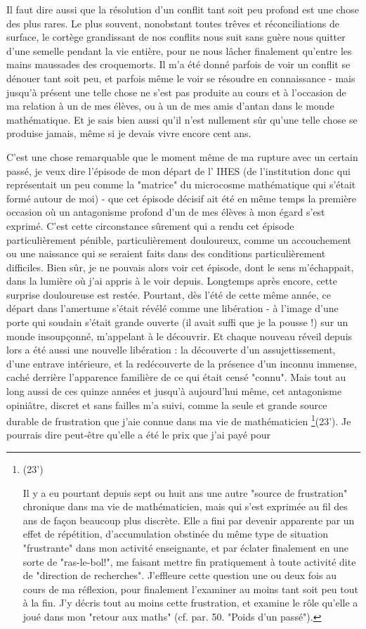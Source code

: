 Il faut dire aussi que la résolution d'un conflit tant soit peu profond est une chose des plus rares. Le plus souvent, nonobstant toutes trêves et réconciliations de surface, le cortège grandissant de nos conflits nous suit sans guère nous quitter d'une semelle pendant la vie entière, pour ne nous lâcher finalement qu'entre les mains maussades des croquemorts. Il m'a été donné parfois de voir un conflit se dénouer tant soit peu, et parfois même le voir se résoudre en connaissance - mais jusqu'à présent une telle chose ne s'est pas produite au cours et à l'occasion de ma relation à un de mes élèves, ou à un de mes amis d'antan dans le monde mathématique. Et je sais bien aussi qu'il n'est nullement sûr qu'une telle chose se produise jamais, même si je devais vivre encore cent ans.

C'est une chose remarquable que le moment même de ma rupture avec un certain passé, je veux dire l'épisode de mon départ de l' IHES (de l'institution donc qui représentait un peu comme la "matrice" du microcosme mathématique qui s'était formé autour de moi) - que cet épisode décisif ait été en même temps la première occasion où un antagonisme profond d'un de mes élèves à mon égard s'est exprimé. C'est cette circonstance sûrement qui a rendu cet épisode particulièrement pénible, particulièrement douloureux, comme un accouchement ou une naissance qui se seraient faits dans des conditions particulièrement difficiles. Bien sûr, je ne pouvais alors voir cet épisode, dont le sens m'échappait, dans la lumière où j'ai appris à le voir depuis. Longtemps après encore, cette surprise douloureuse est restée. Pourtant, dès l'été de cette même année, ce départ dans l'amertume s'était révélé comme une libération - à l'image d'une porte qui soudain s'était grande ouverte (il avait suffi que je la pousse !) sur un monde insoupçonné, m'appelant à le découvrir. Et chaque nouveau réveil depuis lors a été aussi une nouvelle libération : la découverte d'un assujettissement, d'une entrave intérieure, et la redécouverte de la présence d'un inconnu immense, caché derrière l'apparence familière de ce qui était censé "connu". Mais tout au long aussi de ces quinze années et jusqu'à aujourd'hui même, cet antagonisme opiniâtre, discret et sans failles m'a suivi, comme la seule et grande source durable de frustration que j'aie connue dans ma vie de mathématicien \footnote{(23’)\par Il y a eu pourtant depuis sept ou huit ans une autre "source de frustration" chronique dans ma vie de mathématicien, mais qui s'est exprimée au fil des ans de façon beaucoup plus discrète. Elle a fini par devenir apparente par un effet de répétition, d'accumulation obstinée du même type de situation "frustrante" dans mon activité enseignante, et par éclater finalement en une sorte de "ras-le-bol!", me faisant mettre fin pratiquement à toute activité dite de "direction de recherches". J'effleure cette question une ou deux fois au cours de ma réflexion, pour finalement l'examiner au moins tant soit peu tout à la fin. J'y décris tout au moins cette frustration, et examine le rôle qu'elle a joué dans mon "retour aux maths" (cf. par. 50. "Poids d'un passé").}(23’). Je pourrais dire peut-être qu'elle a été le prix que j'ai payé pour 